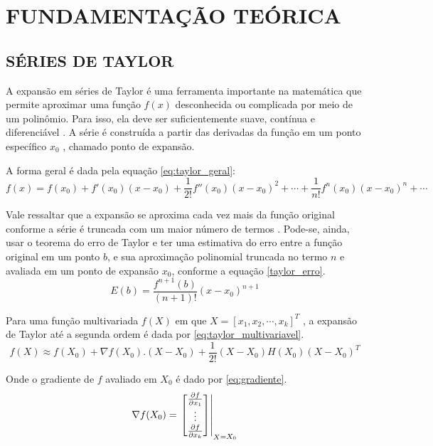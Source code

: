 \chapter{FUNDAMENTAÇÃO TEÓRICA}\label{cap:cap2}

\section{SÉRIES DE TAYLOR}
A expansão em séries de Taylor é uma ferramenta importante na matemática que permite aproximar uma função 
$f(x)$
desconhecida ou complicada por meio de um polinômio. Para isso, ela deve ser suficientemente suave, contínua e diferenciável \cite{Guidorizzi}.
A série é construída a partir das derivadas da função em um ponto específico 
$x_0$
, chamado ponto de expansão.

A forma geral é dada pela equação \eqref{eq:taylor_geral}:
\begin{equation}\label{eq:taylor_geral}
    f(x) = f(x_0) + f'(x_0)(x-x_0) + \frac{1}{2!}f''(x_0)(x-x_0)^2 +\dotsb+ \frac{1}{n!}f^{n}(x_0)(x-x_0)^n + \dotsb
\end{equation}

Vale ressaltar que a expansão se aproxima cada vez mais da função original conforme a série é truncada com um maior número de termos \cite{atkinson1989introduction}.
Pode-se, ainda, usar o teorema do erro de Taylor e ter uma estimativa do erro entre a função original em um ponto $b$,  e sua aproximação polinomial truncada no termo $n$ e avaliada em um ponto de expansão $x_0$, conforme a equação \eqref{taylor_erro}.
\begin{equation}\label{taylor_erro}
    E(b) = \frac{f^{n+1}(b)}{(n+1)!}(x-x_0)^{n+1}
\end{equation}

Para uma função multivariada $f(X)$ em que $X= [x_1,x_2,\cdots,x_k]^T$
, a expansão de Taylor até a segunda ordem é dada por \eqref{eq:taylor_multivariavel}.
\begin{equation}\label{eq:taylor_multivariavel}
f(X) \approx  f(X_0) + \nabla f(X_0).(X-X_0) + \frac{1}{2!} (X-X_0) H(X_0) (X-X_0)^T
\end{equation}

Onde o gradiente de $f$ avaliado em $X_0$ é dado por \eqref{eq:gradiente}.
\begin{equation}\label{eq:gradiente}
    \nabla f(X_0) = 
    \left.
    \begin{bmatrix}
        \frac{\partial f}{\partial x_1} \\
        \vdots \\
        \frac{\partial f}{\partial x_k}
    \end{bmatrix}
    \right|_{\substack X = X_0}
\end{equation}


